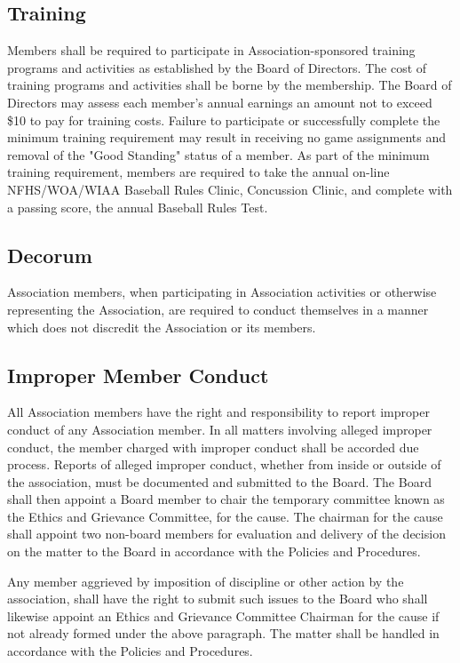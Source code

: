 \documentclass[letterpaper,11pt]{article}
\begin{document}
\subsection{Training}
Members shall be required to participate in Association-sponsored training programs and activities as established by the Board of Directors. The cost of training programs and activities shall be borne by the membership. The Board of Directors may assess each member's annual earnings an amount not to exceed \$10 to pay for training costs. Failure to participate or successfully complete the minimum training requirement may result in receiving no game assignments and removal of the "Good Standing" status of a member. As part of the minimum training requirement, members are required to take the annual on-line NFHS/WOA/WIAA Baseball Rules Clinic, Concussion Clinic, and complete with a passing score, the annual Baseball Rules Test.
\subsection{Decorum}
Association members, when participating in Association activities or otherwise representing the Association, are required to conduct themselves in a manner which does not discredit the Association or its members.

\subsection{Improper Member Conduct}
All Association members have the right and responsibility to report improper conduct of any Association member.  In all matters involving alleged improper conduct, the member charged with improper conduct shall be accorded due process.  Reports of alleged improper conduct, whether from inside or outside of the association, must be documented and submitted to the Board.  The Board shall then appoint a Board member to chair the temporary committee known as the Ethics and Grievance Committee, for the cause.  The chairman for the cause shall appoint two non-board members for evaluation and delivery of the decision on the matter to the Board in accordance with the Policies and Procedures.

Any member aggrieved by imposition of discipline or other action by the association, shall have the right to submit such issues to the Board who shall likewise appoint an Ethics and Grievance Committee Chairman for the cause if not already formed under the above paragraph.  The matter shall be handled in accordance with the Policies and Procedures.
\end{document}
